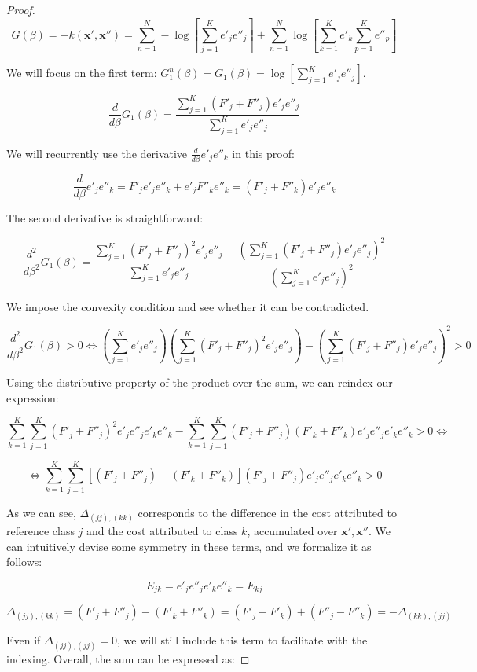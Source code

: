 \begin{proof}
$$
G(\beta) = -k(\bm{x}', \bm{x}'') = \sum_{n=1}^N - \log \left [\sum_{j=1}^K e'_j e''_j \right] + \sum_{n=1}^N \log \left [ \sum_{k=1}^K e'_k \sum_{p=1}^K e''_p \right] 
$$

We will focus on the first term: $G^n_1(\beta) = G_1(\beta) = \log \left [\sum_{j=1}^K e'_j e''_j \right]$.

$$
\frac{d}{d \beta} G_1(\beta) = \frac{\sum_{j=1}^K (F'_j + F''_j)e'_j e''_j }{\sum_{j=1}^K e'_j e''_j }
$$

We will recurrently use the derivative $\frac{d}{d \beta} e'_j e''_k$ in this proof:

$$
\frac{d}{d \beta} e'_j e''_k = F'_j e'_j e''_k +e'_j F''_k  e''_k = (F'_j + F''_k) e'_j e''_k
$$

The second derivative is straightforward:

$$
\frac{d^2}{d \beta ^2} G_1(\beta) = \frac{\sum_{j=1}^K (F'_j + F''_j)^2 e'_j e''_j }{\sum_{j=1}^K e'_j e''_j } - \frac{\left (\sum_{j=1}^K (F'_j + F''_j) e'_j e''_j \right ) ^2}{\left (\sum_{j=1}^K e'_j e''_j \right )^2}
$$

We impose the convexity condition and see whether it can be contradicted.

$$
\frac{d^2}{d \beta ^2} G_1(\beta) > 0 \iff \left(\sum_{j=1}^K e'_j e''_j \right ) \left( \sum_{j=1}^K (F'_j + F''_j)^2 e'_j e''_j  \right ) - \left (\sum_{j=1}^K (F'_j + F''_j) e'_j e''_j \right )^2 > 0
$$

Using the distributive property of the product over the sum, we can reindex our expression:

$$
\sum_{k=1}^K \sum_{j=1}^K (F'_j + F''_j)^2 e'_j e''_j e'_k e''_k - \sum_{k=1}^K \sum_{j=1}^K (F'_j + F''_j) (F'_k + F''_k) e'_j e''_j e'_k e''_k > 0 \iff
$$

$$
\iff \sum_{k=1}^K \sum_{j=1}^K [(F'_j + F''_j) - (F'_k + F''_k) ] (F'_j + F''_j) e'_j e''_j e'_k e''_k  > 0
$$

As we can see, $\Delta_{(jj), (kk)} $ corresponds to the difference in the cost attributed to reference class $j$ and the cost attributed to class $k$, accumulated over $\bm{x}', \bm{x}''$. We can intuitively devise some symmetry in these terms, and we formalize it as follows:

$$
E_{jk} = e'_j e''_j e'_k e''_k = E_{kj}
$$

$$
\Delta_{(jj), (kk)} = (F'_j + F''_j) - (F'_k + F''_k) = (F'_j - F'_k) + (F''_j - F''_k) = - \Delta_{(kk), (jj)}
$$

 Even if $\Delta_{(jj), (jj)} = 0$, we will still include this term to facilitate with the indexing. Overall, the sum can be expressed as:


\end{proof}

